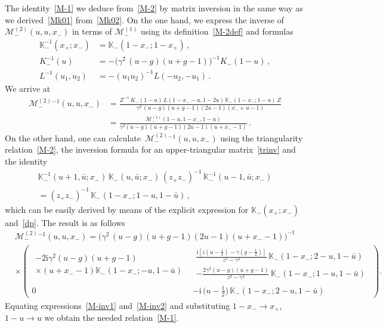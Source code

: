 \documentclass[a4paper,11pt]{article}
\renewcommand{\imath}{\mathrm{i}}
\numberwithin{equation}{section}
\begin{document}
The identity~\eqref{M-1} we deduce from~\eqref{M-2} by matrix inversion in the same way as we derived~\eqref{Mk01} from~\eqref{Mk02}.
On the one hand, we express the inverse of $\mathcal{M}^{(2)}_-(u,u,x_-)$ in terms of $\mathcal{M}^{(1)}_-$ using its definition~\eqref{M-2def} and formulas
\begin{align}
	\nonumber
	\mathbb{K}_-^{-1}(x_+;x_-) & = \mathbb{K}_-(1-x_-;1-x_+) \,, \\
	\nonumber
	K_-^{-1}(u) & =
	-\bigl(\gamma^2\,(u-g)(u+g-1)\bigr)^{-1} K_-(1-u) \,, \\
	\nonumber
	L^{-1}(u_1,u_2) & =
	-(u_1 u_2)^{-1} L(-u_2,-u_1) \,.
\end{align}
We arrive at
\begin{align}
	\nonumber
	\mathcal{M}^{(2)}_-{}^{-1}(u,u,x_-) & =
	\frac{Z^{-1}\,K_-(1-u)\,L(1-x_--u, 1-2u)\,\mathbb{K}_-(1-x_-;1-u)\,Z}{\gamma^2\,(u-g)(u+g-1)(2u-1)(x_-+u-1)} \\
	\label{M-inv1}
	& =
	\frac{\mathcal{M}^{(1)}_-(1-u,1-x_-,1-u)}{\gamma^2(u-g)(u+g-1)(2u-1)(u+x_--1)} \,.
\end{align}
On the other hand, one can calculate~$\mathcal{M}^{(2)}_-{}^{-1}(u,u,x_-)$ using the triangularity relation~\eqref{M-2}, the inversion formula for an upper-triangular matrix~\eqref{trinv} and the identity
\begin{multline} \nonumber
	\mathbb{K}_-^{-1}(u+1,\bar{u};x_-)\,\mathbb{K}_-(u,\bar{u};x_-)\,(z_+z_-)^{-1}\,\mathbb{K}_-^{-1}(u-1,\bar{u};x_-) \\
	= (z_+z_-)^{-1}\,\mathbb{K}_-(1-x_-;1-u,1-\bar{u}) \,,
\end{multline}
which can be easily derived by means of the explicit expression for $\mathbb{K}_-(x_+;x_-)$ and~\eqref{dp}.
The result is as follows
\begin{align}
	& \nonumber
	\mathcal{M}^{(2)}_-{}^{-1}(u,u,x_-) =
	\bigl(\gamma^2\,(u-g)(u+g-1)(2u-1)(u+x_--1)\bigr)^{-1} \\
	& \label{M-inv2}
	\times
	\left(
	\begin{array}{c|c}
		\begin{array}{l}
			-2\imath\gamma^2(u-g)(u+g-1) \\
			\times (u+x_--1)\mathbb{K}_-(1-x_-;-u,1-\bar{u})
		\end{array} &
		\begin{array}{l}
			\frac{\imath[z(u-\frac{1}{2})-\gamma(g-\frac{1}{2})]}{z^2-\gamma^2}\,\mathbb{K}_-(1-x_-;2-u,1-\bar{u}) \\
			-\frac{2\gamma^2(u-g)(u+g-1)}{z^2-\gamma^2}\,\mathbb{K}_-(1-x_-;1-u,1-\bar{u})
		\end{array} \\[12pt]
		\hline
		0 & -\imath\,\bigl(u-\frac{1}{2}\bigr)\,\mathbb{K}_-(1-x_-;2-u,1-\bar{u})
	\end{array}
	\right)\!.
\end{align}
Equating expressions~\eqref{M-inv1} and~\eqref{M-inv2} and substituting $1-x_-\to x_+$, $1-u\to u$ we obtain the needed relation~\eqref{M-1}.
\end{document}
